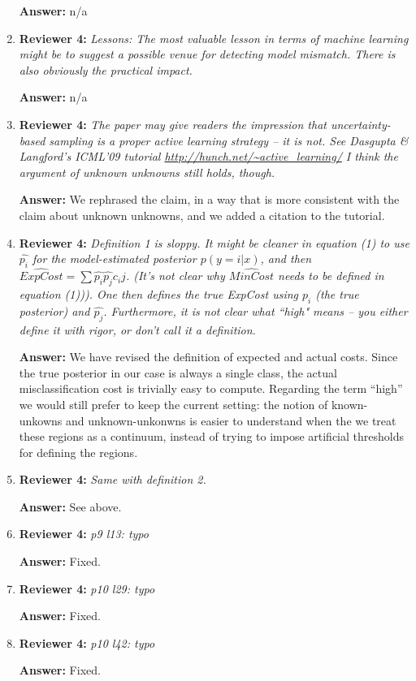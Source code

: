 \documentclass[letterpaper]{article}
\begin{document}
\begin{enumerate}
\textbf{Answer:} n/a

\item \textbf{Reviewer 4:} \emph{ Lessons: The most valuable lesson in terms of machine learning might be to suggest a possible venue for detecting model mismatch.  There is also obviously the practical impact.}

\textbf{Answer:} n/a

\item \textbf{Reviewer 4:} \emph{ The paper may give readers the impression that uncertainty-based sampling is a proper active learning strategy -- it is not.  See Dasgupta \& Langford's ICML'09 tutorial  \url{http://hunch.net/~active_learning/} I think the argument of unknown unknowns still holds, though.}

\textbf{Answer:} We rephrased the claim, in a way that is more consistent with the claim about unknown unknowns, and we added a citation to the tutorial.

\item \textbf{Reviewer 4:} \emph{ Definition 1 is sloppy.  It might be cleaner in equation (1) to use $\hat{p_i}$ for the model-estimated posterior $p(y=i | x)$, and then $\hat{ExpCost}=\sum \hat{p_i} \hat{p_j} c_ij$.  (It's not clear why $\hat{MinCost}$ needs to be defined in equation (1))).  One then defines the true ExpCost using $p_i$ (the true posterior) and $\hat{p_j}$.  Furthermore, it is not clear what ``high" means -- you either define it with rigor, or don't call it a definition.}

\textbf{Answer:} We have revised the definition of expected and actual costs. Since the true posterior in our case is always a single class, the actual misclassification cost is trivially easy to compute. Regarding the term ``high'' we would still prefer to keep the current setting: the notion of known-unkowns and unknown-unkonwns is easier to understand when the we treat these regions as a continuum, instead of trying to impose artificial thresholds for defining the regions.

\item \textbf{Reviewer 4:} \emph{ Same with definition 2.}

\textbf{Answer:} See above.

\item \textbf{Reviewer 4:} \emph{ p9 l13: typo}

\textbf{Answer:} Fixed.

\item \textbf{Reviewer 4:} \emph{ p10 l29: typo}

\textbf{Answer:} Fixed.

\item \textbf{Reviewer 4:} \emph{ p10 l42: typo}

\textbf{Answer:} Fixed.



\end{enumerate}
\end{document}
